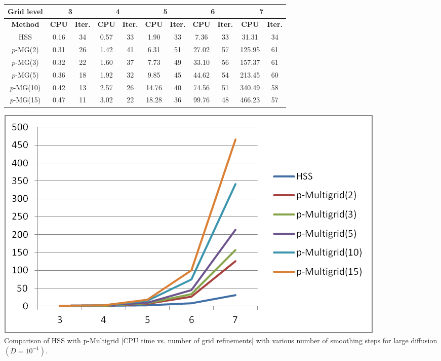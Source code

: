 \documentclass[mathserif]{beamer}
\begin{document}
\begin{frame}
\begin{minipage}{.45\textwidth}
\small
\begin{table}[h!]
\setlength{\tabcolsep}{2.5pt}
\begin{tabular}{|c|c|c|c|c|c|c|c|c|c|c|}
\hline
\textbf{Grid level} & \multicolumn{2}{c|}{\textbf{3}} & \multicolumn{2}{c|}{\textbf{4}} 
& \multicolumn{2}{c|}{\textbf{5}} & \multicolumn{2}{c|}{\textbf{6}} & \multicolumn{2}{c|}{\textbf{7}} \\ 
\hline
\textbf{Method} & {\textbf{CPU}} & {\textbf{Iter.}} & {\textbf{CPU}}
& {\textbf{Iter.}} & {\textbf{CPU}} & {\textbf{Iter.}}
& {\textbf{CPU}} & {\textbf{Iter.}} & {\textbf{CPU}} & {\textbf{Iter.}} \\ 
\hline
HSS        & 0.16 & 34 & 0.57 & 33 &  1.90 & 33 &  7.36 & 33 &  31.31 & 34 \\ \hline
$p$-MG(2)  & 0.31 & 26 & 1.42 & 41 &  6.31 & 51 & 27.02 & 57 & 125.95 & 61 \\ \hline
$p$-MG(3)  & 0.32 & 22 & 1.60 & 37 &  7.73 & 49 & 33.10 & 56 & 157.37 & 61 \\ \hline
$p$-MG(5)  & 0.36 & 18 & 1.92 & 32 &  9.85 & 45 & 44.62 & 54 & 213.45 & 60 \\ \hline
$p$-MG(10) & 0.42 & 13 & 2.57 & 26 & 14.76 & 40 & 74.56 & 51 & 340.49 & 58 \\ \hline
$p$-MG(15) & 0.47 & 11 & 3.02 & 22 & 18.28 & 36 & 99.76 & 48 & 466.23 & 57 \\ \hline
\end{tabular}
\label{CC-comp-D=0.01}
\end{table}
\normalsize
\end{minipage}
\begin{minipage}{.4\textwidth}
\hspace{15mm}
\begin{minipage}{.95\textwidth}
\includegraphics[width=\textwidth]{resultGraphs/circularConvection/comparison1e-1.png}\ \\
{\small {Comparison of HSS with p-Multigrid [CPU time vs. number of grid refinements] with various number of smoothing steps for large diffusion $(D = 10^{-1})$.}}
\end{minipage}
\end{minipage}
\end{frame}
\end{document}

